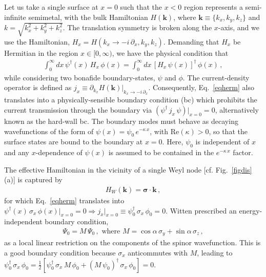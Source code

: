 \documentclass[aps,prl,twocolumn,nofootinbib,showkeys, nolongbibliography, 10pt]{revtex4-2}
\begin{document}
Let us take a single surface at $x=0$ such that the $x<0$ region represents a semi-infinite semimetal, with the bulk Hamiltonian $H(\mathbf k)$, where $\mathbf k \equiv \lbrace k_x, k_y, k_z \rbrace $ and $k =\sqrt{k_x^2 + k_y^2 + k_z^2}$. The translation symmetry is broken along the $x$-axis, and we use the Hamiltonian,
$ H_x = H (k_x \rightarrow -i \, \partial_x , k_y, k_z)$. Demanding that $H_x $ be Hermitian in the region $x \in [0, \infty)$, we have the physical condition that
\begin{align}
\label{eqherm}
 \int_0^\infty  dx \,\psi^\dagger (x) \, H_x\,\phi (x) = 
 \int_0^\infty  dx\, [H_x\, \psi(x) ]^\dagger\,\phi(x) \,,
\end{align}
while considering two bonafide boundary-states, $\psi $ and $\phi$. The current-density operator is defined as
$ j_x \equiv \partial_{k_x}  H(\mathbf k) \vert_{k_x \rightarrow -i\, \partial_x}$.
Consequently, Eq.~\eqref{eqherm} also translates into a physically-sensible boundary condition (bc) which prohibits the current transmission through the boundary via $ (\psi^\dagger \, j_x \, \psi )\vert_{x=0}= 0$, alternatively known as the hard-wall bc. The boundary modes must behave as decaying wavefunctions of the form of $
\psi (x) = \psi_0 \, e^{- \kappa \, x}$, with $ \text{Re}(\kappa) > 0$, so that the surface states are bound to the boundary at $ x= 0 $. Here, $\psi_0$ is independent of $x$ and any $x$-dependence of $\psi(x)$ is assumed to be contained in the $ e^{- \kappa \, x}$ factor. 


The effective Hamiltonian in the vicinity of a single Weyl node [cf. Fig.~\ref{figdis}(a)] is captured by
\begin{align}
\label{eqweyl}
H_W (\mathbf k) = \boldsymbol{\sigma} \cdot {\mathbf k}\,,
\end{align}
for which Eq.~\eqref{eqherm} translates into
$\psi^\dagger (x)\, \sigma_x \, \phi (x) \vert_{x=0} = 0
\Rightarrow j_x\vert_{x=0} \equiv \psi_0^\dagger\, \sigma_x \, \phi_0  = 0$.
Witten \cite{witten} prescribed an energy-independent boundary condition,
\begin{align}
\label{eqalpha}
\Psi_0 =  M \, \Psi_0\,, \text{ where } M = \cos \alpha \, \sigma_y + \sin  \alpha \, \sigma_z \,,
\end{align}
as a local linear restriction on the components of the spinor wavefunction.
This is a good boundary condition because $\sigma_x $ anticommutes with $M$, leading to
$
 \psi_0^\dagger\, \sigma_x \, \phi_0 = 
 \frac{1}{2} \left[ \psi_0^\dagger\, \sigma_x \,M\, \phi_0 
 + ( M\, \psi_0)^\dagger\, \sigma_x \, \phi_0 \right ]  = 0$.
\end{document}
